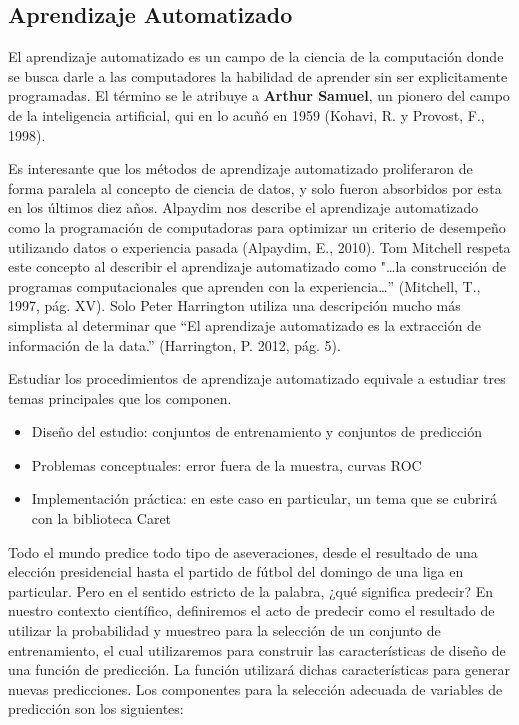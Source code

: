 \begin{spacing}{1.5}
\section{Aprendizaje Automatizado}
El aprendizaje automatizado es un campo de la ciencia de la computación donde se busca darle a las computadores la habilidad de aprender sin ser explicitamente programadas. El término se le atribuye a \textbf{Arthur Samuel}, un pionero del campo de la inteligencia artificial, qui	en lo acuñó en 1959 (Kohavi, R. y Provost, F., 1998). 

Es interesante que los métodos de aprendizaje automatizado proliferaron de forma paralela al concepto de ciencia de datos, y solo fueron absorbidos por esta en los últimos diez años. Alpaydim nos describe el aprendizaje automatizado como la programación de computadoras para optimizar un criterio de desempeño utilizando datos o experiencia pasada (Alpaydim, E., 2010). Tom Mitchell respeta este concepto al describir el aprendizaje automatizado como "\ldots la construcción de programas computacionales que aprenden con la experiencia\ldots” (Mitchell, T., 1997, pág. XV). Solo Peter Harrington utiliza una descripción mucho más simplista al determinar que “El aprendizaje automatizado es la extracción de información de la data.” (Harrington, P. 2012, pág. 5). 

Estudiar los procedimientos de aprendizaje automatizado equivale a estudiar tres temas principales que los componen.

\begin{itemize}
	\item Diseño del estudio: conjuntos de entrenamiento y conjuntos de predicción
	\item Problemas conceptuales: error fuera de la muestra, curvas ROC
	\item Implementación práctica: en este caso en particular, un tema que se cubrirá con la biblioteca Caret
\end{itemize}

Todo el mundo predice todo tipo de aseveraciones, desde el resultado de una elección presidencial hasta el partido de fútbol del domingo de una liga en particular. Pero en el sentido estricto de la palabra, ¿qué significa predecir? En nuestro contexto científico, definiremos el acto de predecir como el resultado de utilizar la probabilidad y muestreo para la selección de un conjunto de entrenamiento, el cual utilizaremos para construir las características de diseño de una función de predicción. La función utilizará dichas características para generar nuevas predicciones.  Los componentes para la selección adecuada de variables de predicción son los siguientes:


\end{spacing}

